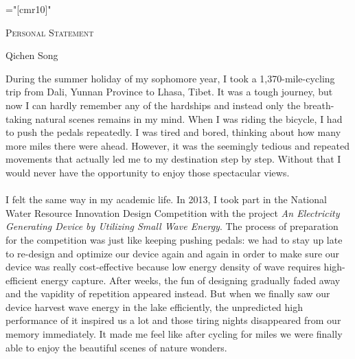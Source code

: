 \documentclass[a4paper,10pt]{article}
\begin{document}
\thispagestyle {fancy}
\pagestyle{fancy}
\fancyfoot{}%
\begin{spacing}{1.5}
{}
{}



\font\fb="[cmr10]" %
\begin{center} {  \vspace{3em}  }  \end{center}
\begin{center} {\par\LARGE {\textsc{Personal Statement}}     }  \end{center}%
\vspace{0.0em}
\begin{center} {\large {Qichen Song}     }  \end{center}
\vspace{1.5em}
During the summer holiday of my sophomore year, I took a 1,370-mile-cycling trip from Dali, Yunnan Province to Lhasa, Tibet. It was a tough journey, but now I can hardly remember any of the hardships and instead only the breath-taking natural scenes remains in my mind. When I was riding the bicycle, I had to push the pedals repeatedly. I was tired and bored, thinking about how many more miles there were ahead. However, it was the seemingly tedious and repeated movements that actually led me to my destination step by step. Without that I would never have the opportunity to enjoy those spectacular views.\\
\\
I felt the same way in my academic life. In 2013, I took part in the National Water Resource Innovation Design Competition with the project \emph{An Electricity Generating Device by Utilizing Small Wave Energy}. The process of preparation for the competition was just like keeping pushing pedals: we had to stay up late to re-design and optimize our device again and again in order to make sure our device was really cost-effective because low energy density of wave requires high-efficient energy capture. After weeks, the fun of designing gradually faded away and the vapidity of repetition appeared instead. But when we finally saw our device harvest wave energy in the lake efficiently, the unpredicted high performance of it inspired us a lot and those tiring nights disappeared from our memory immediately. It made me feel like after cycling for miles we were finally able to enjoy the beautiful scenes of nature wonders.\\

\end{spacing}
\end{document}
